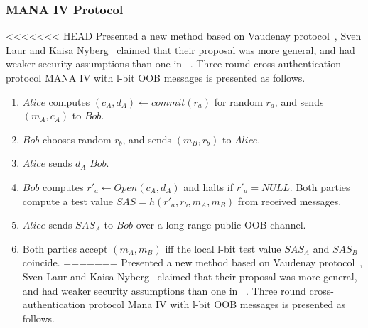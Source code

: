 \begin{enumerate}
\begin{enumerate}
\begin{center}
\end{center}

\subsubsection*{MANA IV Protocol}

<<<<<<< HEAD
Presented a new method based on Vaudenay protocol~\cite{Vaudenay:2005qa}, Sven Laur and Kaisa Nyberg~\cite{Laur:2006kl} claimed that their proposal was more general, and had weaker security assumptions than one in ~\cite{Pasini:2006fu}. Three round cross-authentication protocol MANA IV with l-bit OOB messages is presented as follows. 

\begin{enumerate}
\item $Alice$ computes $(c_A,d_A) \leftarrow commit(r_a)$ for random $r_a$, and sends $(m_A,c_A)$ to $Bob$.
\item $Bob$ chooses random $r_b$, and sends $(m_B,r_b)$ to $Alice$.
\item $Alice$ sends $d_A$ $Bob$.
\item $Bob$ computes $r'_a \leftarrow Open(c_A,d_A)$ and halts if $r'_a= NULL$. Both parties compute a test value $SAS = h(r'_a,r_b,m_A,m_B)$ from received messages.
\item $Alice$ sends $SAS_A$ to $Bob$ over a long-range public OOB channel. 
\item Both parties accept $(m_A,m_B)$ iff the local l-bit test value $SAS_A$ and $SAS_B$ coincide. 
=======
Presented a new method based on Vaudenay protocol~\cite{Vaudenay:2005qa}, Sven Laur and Kaisa Nyberg~\cite{Laur:2006kl} claimed that their proposal was more general, and had weaker security assumptions than one in ~\cite{Pasini:2006fu}. Three round cross-authentication protocol Mana IV with l-bit OOB messages is presented as follows. 


\end{enumerate}
\end{enumerate}
\end{enumerate}
